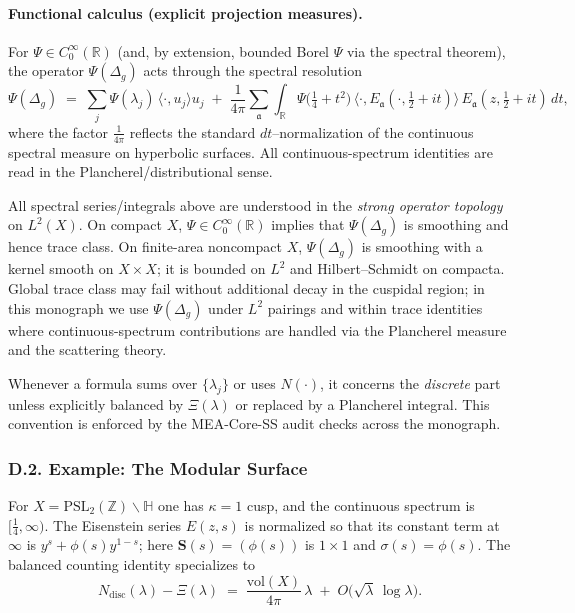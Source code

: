 \paragraph{Functional calculus (explicit projection measures).}
For $\Psi\in C_0^\infty(\mathbb{R})$ (and, by extension, bounded Borel $\Psi$ via the spectral theorem), the operator $\Psi(\Delta_g)$ acts through the spectral resolution
\[
  \Psi(\Delta_g) \;=\; \sum_{j} \Psi(\lambda_j)\,\langle \cdot, u_j\rangle u_j
  \;+\; \frac{1}{4\pi}\sum_{\mathfrak{a}}
      \int_{\mathbb{R}} \Psi\!\big(\tfrac14+t^2\big)\,
      \langle \cdot, E_{\mathfrak a}(\cdot,\tfrac12+it)\rangle\,
      E_{\mathfrak a}(z,\tfrac12+it)\,dt,
\]
where the factor $\frac{1}{4\pi}$ reflects the standard $dt$–normalization of the continuous spectral measure on hyperbolic surfaces.
All continuous-spectrum identities are read in the Plancherel/distributional sense.

\begin{remark}
All spectral series/integrals above are understood in the \emph{strong operator topology} on $L^2(X)$.
On compact $X$, $\Psi\in C_0^\infty(\mathbb{R})$ implies that $\Psi(\Delta_g)$ is smoothing and hence trace class.
On finite-area noncompact $X$, $\Psi(\Delta_g)$ is smoothing with a kernel smooth on $X\times X$; it is bounded on $L^2$
and Hilbert–Schmidt on compacta. Global trace class may fail without additional decay in the cuspidal region; in this monograph
we use $\Psi(\Delta_g)$ under $L^2$ pairings and within trace identities where continuous-spectrum contributions are handled
via the Plancherel measure and the scattering theory.
\end{remark}

\begin{remark}
Whenever a formula sums over $\{\lambda_j\}$ or uses $N(\cdot)$, it concerns the \emph{discrete} part unless explicitly balanced by $\Xi(\lambda)$ or replaced by a Plancherel integral.
This convention is enforced by the MEA-Core-SS audit checks across the monograph.
\end{remark}

\subsubsection*{D.2. Example: The Modular Surface}
For $X=\mathrm{PSL}_2(\mathbb{Z})\backslash\mathbb{H}$ one has $\kappa=1$ cusp, and the continuous spectrum is $[\tfrac14,\infty)$.
The Eisenstein series $E(z,s)$ is normalized so that its constant term at $\infty$ is $y^s+\phi(s)y^{1-s}$; here $\mathbf S(s)=(\phi(s))$ is $1\times 1$ and $\sigma(s)=\phi(s)$.
The balanced counting identity specializes to
\[
  N_{\mathrm{disc}}(\lambda) - \Xi(\lambda)
  \;=\; \frac{\mathrm{vol}(X)}{4\pi}\,\lambda
  \;+\; O\!\big(\sqrt{\lambda}\,\log\lambda\big).
\]

